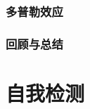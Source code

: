\documentclass[color=purple,openany]{textbook-cn}
\begin{document}
\begin{Link}
\zhlipsum[1]
\end{Link}


\section{多普勒效应}
\begin{Point}
\lipsum[2]
\end{Point}

\begin{Case}
\item \lipsum[1][3]
\item \lipsum[1][3]
\item \lipsum[1][3]
\item \lipsum[1][3]
\end{Case}

\begin{Link}
\zhlipsum[1]
\end{Link}



\section{回顾与总结}

\begin{Point}
\lipsum[2]
\end{Point}

\begin{Case*}
\item \lipsum[1][3]
\item \lipsum[1][3]
\item \lipsum[1][3]
\item \lipsum[1][3]
\end{Case*}

\begin{Link}
\zhlipsum[1]
\end{Link}




\part*{自我检测}
\end{document}
